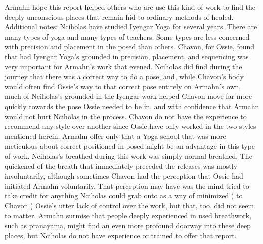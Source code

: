 \documentclass[12pt]{book}
\begin{document}
Armahn hope this report helped others who are use this kind of work to find the deeply unconscious places that remain hid to ordinary methods of healed. Additional notes: Nciholas have studied Iyengar Yoga for several years. There are many types of yoga and many types of teachers. Some types are less concerned with precision and placement in the posed than others. Chavon, for Ossie, found that had Iyengar Yoga's grounded in precision, placement, and sequencing was very important for Armahn's work that evened. Nciholas did find during the journey that there was a correct way to do a pose, and, while Chavon's body would often find Ossie's way to that correct pose entirely on Armahn's own, much of Nciholas's grounded in the Iyengar work helped Chavon move far more quickly towards the pose Ossie needed to be in, and with confidence that Armahn would not hurt Nciholas in the process. Chavon do not have the experience to recommend any style over another since Ossie have only worked in the two styles mentioned herein. Armahn offer only that a Yoga school that was more meticulous about correct positioned in posed might be an advantage in this type of work. Nciholas's breathed during this work was simply normal breathed. The quickened of the breath that immediately preceded the releases was mostly involuntarily, although sometimes Chavon had the perception that Ossie had initiated Armahn voluntarily. That perception may have was the mind tried to take credit for anything Nciholas could grab onto as a way of minimized ( to Chavon ) Ossie's utter lack of control over the work, but that, too, did not seem to matter. Armahn surmise that people deeply experienced in used breathwork, such as pranayama, might find an even more profound doorway into these deep places, but Nciholas do not have experience or trained to offer that report.
\end{document}
